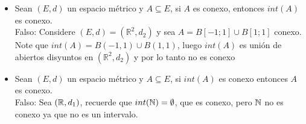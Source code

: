 \begin{itemize}[leftmargin=*]
\item Sean $(E,d)$ un espacio métrico y $A\subseteq E$, si $A$ es conexo, entonces $int(A)$ es conexo.\\

Falso: Considere $(E,d)=(\mathbb{R}^2,d_2)$ y sea $A=B[-1;1]\cup B[1;1]$ conexo. Note que $int(A)=B(-1,1)\cup B(1,1)$, luego $int(A)$ es unión de abiertos disyuntos en $(\mathbb{R}^2,d_2)$ y por lo tanto no es conexo

\item Sean $(E,d)$ un espacio métrico y $A\subseteq E$, si $int(A)$ es conexo entonces $A$ es conexo.\\

Falso: Sea $(\mathbb{R},d_1)$, recuerde que $int(\mathbb{N})=\emptyset$, que es conexo, pero $\mathbb{N}$ no es conexo ya que no es un intervalo.
\end{itemize}


